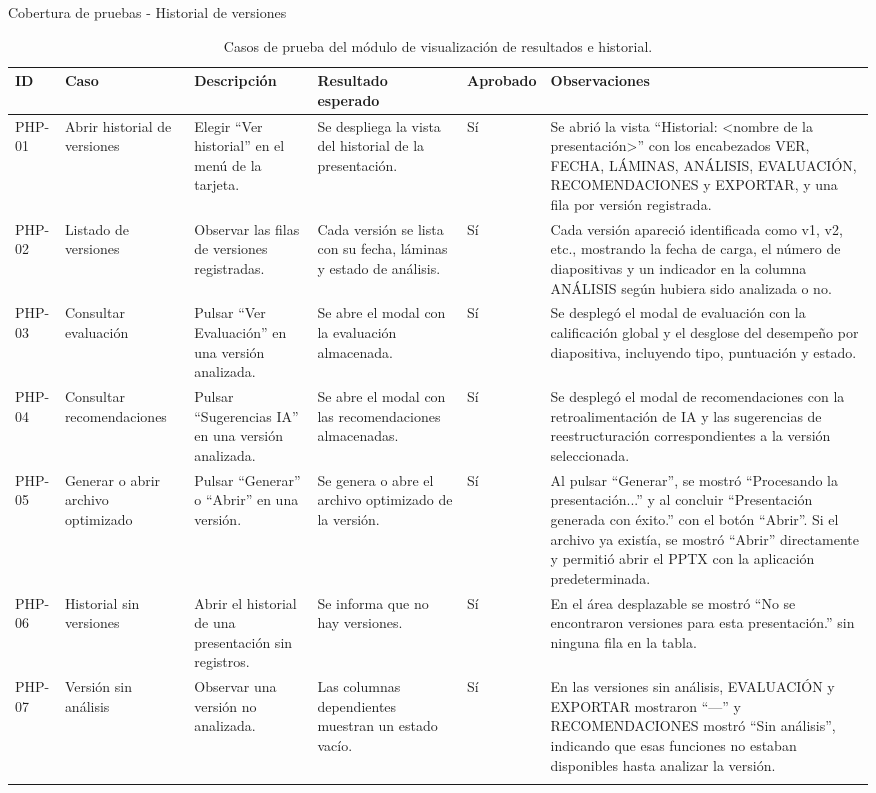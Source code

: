 \documentclass[11pt]{article}
\begin{document}
\clearpage  
Cobertura de pruebas - Historial de versiones 

{\tiny
\renewcommand{\arraystretch}{1.25}
\begin{longtable}{@{}|L{1.2cm}|L{2.5cm}|L{3.4cm}|L{3.8cm}|L{1.5cm}|L{2.3cm}|@{}}
\hline
\textbf{ID} & \textbf{Caso} & \textbf{Descripción} & \textbf{Resultado esperado} & \textbf{Aprobado} & \textbf{Observaciones} \\ \hline
\endhead
PHP-01 & Abrir historial de versiones & Elegir ``Ver historial'' en el menú de la tarjeta. & Se despliega la vista del historial de la presentación. & Sí & Se abrió la vista “Historial: <nombre de la presentación>” con los encabezados VER, FECHA, LÁMINAS, ANÁLISIS, EVALUACIÓN, RECOMENDACIONES y EXPORTAR, y una fila por versión registrada. \\ \hline
PHP-02 & Listado de versiones & Observar las filas de versiones registradas. & Cada versión se lista con su fecha, láminas y estado de análisis. & Sí & Cada versión apareció identificada como v1, v2, etc., mostrando la fecha de carga, el número de diapositivas y un indicador en la columna ANÁLISIS según hubiera sido analizada o no. \\ \hline
PHP-03 & Consultar evaluación & Pulsar ``Ver Evaluación'' en una versión analizada. & Se abre el modal con la evaluación almacenada. & Sí & Se desplegó el modal de evaluación con la calificación global y el desglose del desempeño por diapositiva, incluyendo tipo, puntuación y estado. \\ \hline
PHP-04 & Consultar recomendaciones & Pulsar ``Sugerencias IA'' en una versión analizada. & Se abre el modal con las recomendaciones almacenadas. & Sí & Se desplegó el modal de recomendaciones con la retroalimentación de IA y las sugerencias de reestructuración correspondientes a la versión seleccionada. \\ \hline
PHP-05 & Generar o abrir archivo optimizado & Pulsar ``Generar'' o ``Abrir'' en una versión. & Se genera o abre el archivo optimizado de la versión. & Sí & Al pulsar “Generar”, se mostró “Procesando la presentación...” y al concluir “Presentación generada con éxito.” con el botón “Abrir”. Si el archivo ya existía, se mostró “Abrir” directamente y permitió abrir el PPTX con la aplicación predeterminada. \\ \hline
PHP-06 & Historial sin versiones & Abrir el historial de una presentación sin registros. & Se informa que no hay versiones. & Sí & En el área desplazable se mostró “No se encontraron versiones para esta presentación.” sin ninguna fila en la tabla. \\ \hline
PHP-07 & Versión sin análisis & Observar una versión no analizada. & Las columnas dependientes muestran un estado vacío. & Sí & En las versiones sin análisis, EVALUACIÓN y EXPORTAR mostraron “---” y RECOMENDACIONES mostró “Sin análisis”, indicando que esas funciones no estaban disponibles hasta analizar la versión. \\ \hline
\caption{Casos de prueba del módulo de visualización de resultados e historial.}
\label{tab:casos-prueba-modulo-historial}
\end{longtable}
}
\end{document}
